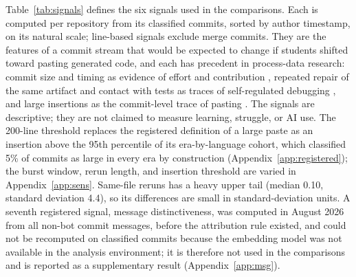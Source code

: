 \documentclass[acmsmall,screen,review,anonymous]{acmart}
\begin{document}
Table~\ref{tab:signals} defines the six signals used in the comparisons. Each is computed per repository from its classified commits, sorted by author timestamp, on its natural scale; line-based signals exclude merge commits. They are the features of a commit stream that would be expected to change if students shifted toward pasting generated code, and each has precedent in process-data research: commit size and timing as evidence of effort and contribution \citep{hundhausen2023github, hsing2019github, macak2021process}, repeated repair of the same artifact and contact with tests as traces of self-regulated debugging \citep{loksa2022metacognition}, and large insertions as the commit-level trace of pasting \citep{kazemitabaar2023novices, prather2024widening}. The signals are descriptive; they are not claimed to measure learning, struggle, or AI use. The 200-line threshold replaces the registered definition of a large paste as an insertion above the 95th percentile of its era-by-language cohort, which classified 5\% of commits as large in every era by construction (Appendix~\ref{app:registered}); the burst window, rerun length, and insertion threshold are varied in Appendix~\ref{app:sens}. Same-file reruns has a heavy upper tail (median 0.10, standard deviation 4.4), so its differences are small in standard-deviation units. A seventh registered signal, message distinctiveness, was computed in August 2026 from all non-bot commit messages, before the attribution rule existed, and could not be recomputed on classified commits because the embedding model was not available in the analysis environment; it is therefore not used in the comparisons and is reported as a supplementary result (Appendix~\ref{app:msg}).
\end{document}
